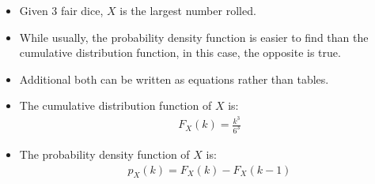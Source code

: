 \documentclass[12pt]{article}
\begin{document}
\begin{enumerate}
\begin{itemize}
                    \item Given $3$ fair dice, $X$ is the largest number rolled.
                    \item While usually, the probability density function is easier to find than the cumulative distribution function, in this case, the opposite is true.
                    \item Additional both can be written as equations rather than tables.
                    \item The cumulative distribution function of $X$ is:
                    \begin{align*}
                        F_X(k) = \frac{k^3}{6^3}
                    \end{align*}
                    \item The probability density function of $X$ is:
                    \begin{align*}
                        p_X(k) = F_X(k) - F_X(k-1)
                    \end{align*}
                \end{itemize}
            \end{enumerate}
\end{document}
